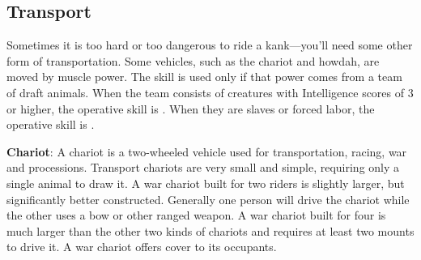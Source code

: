 \subsection{Transport}
Sometimes it is too hard or too dangerous to ride a kank---you'll need some other form of transportation. Some vehicles, such as the chariot and howdah, are moved by muscle power. The  skill is used only if that power comes from a team of draft animals. When the team consists of creatures with Intelligence scores of 3 or higher, the operative skill is . When they are slaves or forced labor, the operative skill is .


\textbf{Chariot}: A chariot is a two-wheeled vehicle used for transportation, racing, war and processions. Transport chariots are very small and simple, requiring only a single animal to draw it. A war chariot built for two riders is slightly larger, but significantly better constructed. Generally one person will drive the chariot while the other uses a bow or other ranged weapon. A war chariot built for four is much larger than the other two kinds of chariots and requires at least two mounts to drive it. A war chariot offers cover to its occupants.

